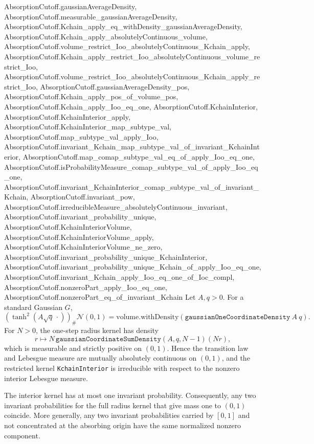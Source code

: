 \begin{lemma}
{    AbsorptionCutoff.gaussianAverageDensity,
    AbsorptionCutoff.measurable_gaussianAverageDensity,
    AbsorptionCutoff.Kchain_apply_eq_withDensity_gaussianAverageDensity,
    AbsorptionCutoff.Kchain_apply_absolutelyContinuous_volume,
    AbsorptionCutoff.volume_restrict_Ioo_absolutelyContinuous_Kchain_apply,
    AbsorptionCutoff.Kchain_apply_restrict_Ioo_absolutelyContinuous_volume_restrict_Ioo,
    AbsorptionCutoff.volume_restrict_Ioo_absolutelyContinuous_Kchain_apply_restrict_Ioo,
    AbsorptionCutoff.gaussianAverageDensity_pos,
    AbsorptionCutoff.Kchain_apply_pos_of_volume_pos,
    AbsorptionCutoff.Kchain_apply_Ioo_eq_one,
    AbsorptionCutoff.KchainInterior,
    AbsorptionCutoff.KchainInterior_apply,
    AbsorptionCutoff.KchainInterior_map_subtype_val,
    AbsorptionCutoff.map_subtype_val_apply_Ioo,
    AbsorptionCutoff.invariant_Kchain_map_subtype_val_of_invariant_KchainInterior,
    AbsorptionCutoff.map_comap_subtype_val_eq_of_apply_Ioo_eq_one,
    AbsorptionCutoff.isProbabilityMeasure_comap_subtype_val_of_apply_Ioo_eq_one,
    AbsorptionCutoff.invariant_KchainInterior_comap_subtype_val_of_invariant_Kchain,
    AbsorptionCutoff.invariant_pow,
    AbsorptionCutoff.irreducibleMeasure_absolutelyContinuous_invariant,
    AbsorptionCutoff.invariant_probability_unique,
    AbsorptionCutoff.KchainInteriorVolume,
    AbsorptionCutoff.KchainInteriorVolume_apply,
    AbsorptionCutoff.KchainInteriorVolume_ne_zero,
    AbsorptionCutoff.invariant_probability_unique_KchainInterior,
    AbsorptionCutoff.invariant_probability_unique_Kchain_of_apply_Ioo_eq_one,
    AbsorptionCutoff.invariant_Kchain_apply_Ioo_eq_one_of_Ioc_compl,
    AbsorptionCutoff.nonzeroPart_apply_Ioo_eq_one,
    AbsorptionCutoff.nonzeroPart_eq_of_invariant_Kchain}
  \leanok
  Let $A,q>0$. For a standard Gaussian $G$,
  \[
    (\tanh^2(A\sqrt q\,\cdot))_\#\mathcal N(0,1)
    =
    \mathrm{volume.withDensity}
      (\texttt{gaussianOneCoordinateDensity}\ A\ q).
  \]
  For $N>0$, the one-step radius kernel has density
  \[
    r\longmapsto
    N\,\texttt{gaussianCoordinateSumDensity}(A,q,N-1)(Nr),
  \]
  which is measurable and strictly positive on $(0,1)$. Hence the transition
  law and Lebesgue measure are mutually absolutely continuous on $(0,1)$, and
  the restricted kernel \texttt{KchainInterior} is irreducible with respect
  to the nonzero interior Lebesgue measure.

  The interior kernel has at most one invariant probability. Consequently,
  any two invariant probabilities for the full radius kernel that give mass
  one to $(0,1)$ coincide. More generally, any two invariant probabilities
  carried by $[0,1]$ and not concentrated at the absorbing origin have the
  same normalized nonzero component.
\end{lemma}
